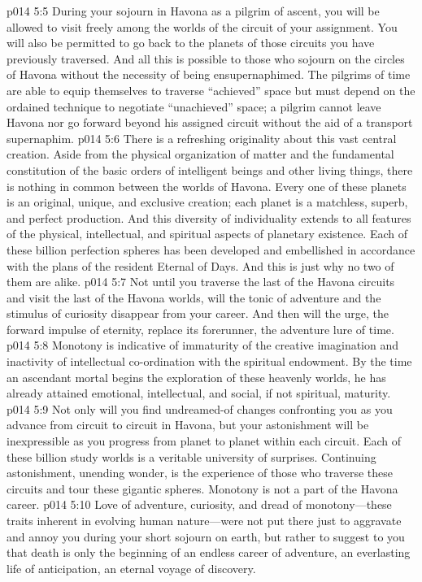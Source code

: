 \vs p014 5:5 During your sojourn in Havona as a pilgrim of ascent, you will be allowed to visit freely among the worlds of the circuit of your assignment. You will also be permitted to go back to the planets of those circuits you have previously traversed. And all this is possible to those who sojourn on the circles of Havona without the necessity of being ensupernaphimed. The pilgrims of time are able to equip themselves to traverse “achieved” space but must depend on the ordained technique to negotiate “unachieved” space; a pilgrim cannot leave Havona nor go forward beyond his assigned circuit without the aid of a transport supernaphim.
\pc \vs p014 5:6 There is a refreshing originality about this vast central creation. Aside from the physical organization of matter and the fundamental constitution of the basic orders of intelligent beings and other living things, there is nothing in common between the worlds of Havona. Every one of these planets is an original, unique, and exclusive creation; each planet is a matchless, superb, and perfect production. And this diversity of individuality extends to all features of the physical, intellectual, and spiritual aspects of planetary existence. Each of these billion perfection spheres has been developed and embellished in accordance with the plans of the resident Eternal of Days. And this is just why no two of them are alike.\plusone
\vs p014 5:7 Not until you traverse the last of the Havona circuits and visit the last of the Havona worlds, will the tonic of adventure and the stimulus of curiosity disappear from your career. And then will the urge, the forward impulse of eternity, replace its forerunner, the adventure lure of time.
\vs p014 5:8 Monotony is indicative of immaturity of the creative imagination and inactivity of intellectual co\hyp{}ordination with the spiritual endowment. By the time an ascendant mortal begins the exploration of these heavenly worlds, he has already attained emotional, intellectual, and social, if not spiritual, maturity.
\vs p014 5:9 Not only will you find undreamed\hyp{}of changes confronting you as you advance from circuit to circuit in Havona, but your astonishment will be inexpressible as you progress from planet to planet within each circuit. Each of these billion study worlds is a veritable university of surprises. Continuing astonishment, unending wonder, is the experience of those who traverse these circuits and tour these gigantic spheres. Monotony is not a part of the Havona career.\plusone
\vs p014 5:10 Love of adventure, curiosity, and dread of monotony---these traits inherent in evolving human nature---were not put there just to aggravate and annoy you during your short sojourn on earth, but rather to suggest to you that death is only the beginning of an endless career of adventure, an everlasting life of anticipation, an eternal voyage of discovery.\plusone
